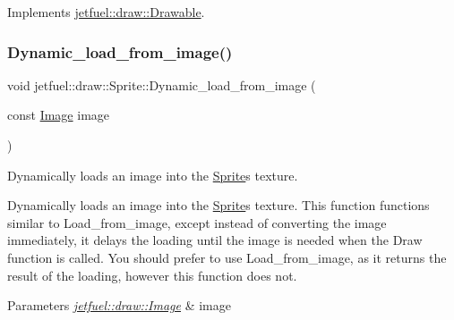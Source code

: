 Implements \hyperlink{classjetfuel_1_1draw_1_1Drawable_a1a072070322965ce9411ee6e7c311c56}{jetfuel\+::draw\+::\+Drawable}.

\mbox{\label{classjetfuel_1_1draw_1_1Sprite_ac7d3ecd6736a3dfb6af35fd099efec8b}} 
\subsubsection{\texorpdfstring{Dynamic\+\_\+load\+\_\+from\+\_\+image()}{Dynamic\_load\_from\_image()}}
{\footnotesize\ttfamily void jetfuel\+::draw\+::\+Sprite\+::\+Dynamic\+\_\+load\+\_\+from\+\_\+image (\begin{DoxyParamCaption}\item[{const \hyperlink{classjetfuel_1_1draw_1_1Image}{Image}}]{image }\end{DoxyParamCaption})}



Dynamically loads an image into the \hyperlink{classjetfuel_1_1draw_1_1Sprite}{Sprite}\textquotesingle{}s texture. 

Dynamically loads an image into the \hyperlink{classjetfuel_1_1draw_1_1Sprite}{Sprite}\textquotesingle{}s texture. This function functions similar to Load\+\_\+from\+\_\+image, except instead of converting the image immediately, it delays the loading until the image is needed when the Draw function is called. You should prefer to use Load\+\_\+from\+\_\+image, as it returns the result of the loading, however this function does not.


\begin{DoxyParams}{Parameters}
{\em \hyperlink{classjetfuel_1_1draw_1_1Image}{jetfuel\+::draw\+::\+Image}} & image \\
\hline
\end{DoxyParams}
\mbox{\label{classjetfuel_1_1draw_1_1Sprite_a9db9565b3e5db44676ae4a5f6c187753}} 
